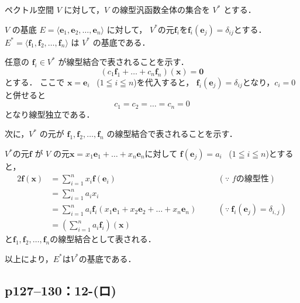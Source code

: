 \begin{tproof}
  ペクトル空間 $V$ に対して，$V$ の線型汎函数全体の集合を $V^*$ とする．

  $V$ の基底 $E= \langle \bm{e}_1, \bm{e}_2, \dots, \bm{e}_n\rangle $ に対して，
  $V^*$の元$\bm{f}_i$を$\bm{f}_i(\bm{e}_j)=\delta_{ij}$とする．
  $E^* = \langle \bm{f}_1, \bm{f}_2, \dots, \bm{f}_n\rangle$ は $V^*$ の基底である．

  任意の $\bm{f}_i  \in V^*$ が線型結合で表されることを示す．
  \[
    (c_1 \bm{f}_1 + \dots + c_n \bm{f}_n) (\bm{x}) = \bm{0}
  \]
  とする．
  ここで $\bm{x} = \bm{e}_i$ ~($1 \leqq i \leqq n$)を代入すると，
  $\bm{f}_i (\bm{e}_j) = \delta_{ij}$となり，$c_i =0$と併せると
  \[
    c_1=c_2 = \dots =c_n = 0
  \]
  となり線型独立である．

  次に，$V^\ast$ の元が $\bm{f}_1, \bm{f}_2, \dots, \bm{f}_n$ の線型結合で表されることを示す．

  $V^\ast$の元$\bm{f}$ が $V$ の元$\bm{x}=x_1 \bm{e}_1 + \dots + x_n \bm{e}_n$に対して
  $\bm{f}(\bm{e}_j) = a_i$~ ($1 \leqq i \leqq n$)とすると，
  \begin{alignat*}{2}
    \bm{f} (\bm{x}) & = \sum_{i=1}^{n} x_i \bm{f}(\bm{e}_i)                                            & \quad & (\text{$\because$~$f$の線型性})                           \\
                    & = \sum_{i=1}^{n} a_i x_i                                                         &       &                                                       \\
                    & = \sum_{i=1}^{n} a_i \bm{f}_i (x_1 \bm{e}_1 + x_2 \bm{e}_2 +\dots+ x_n \bm{e}_n) & \quad & (\text{$\because~ \bm{f}_i (\bm{e}_j)=\delta_{i,j}$}) \\
                    & = \left( \sum_{i=1}^{n} a_i \bm{f}_i \right) (\bm{x})                            &       &
  \end{alignat*}
  と$\bm{f}_1 , \bm{f}_2 , \dots ,\bm{f}_n$の線型結合として表される．

  以上により，$E^\ast$は$V^\ast$の基底である．
\end{tproof}


\subsection*{p127--130：12-(ロ)}

